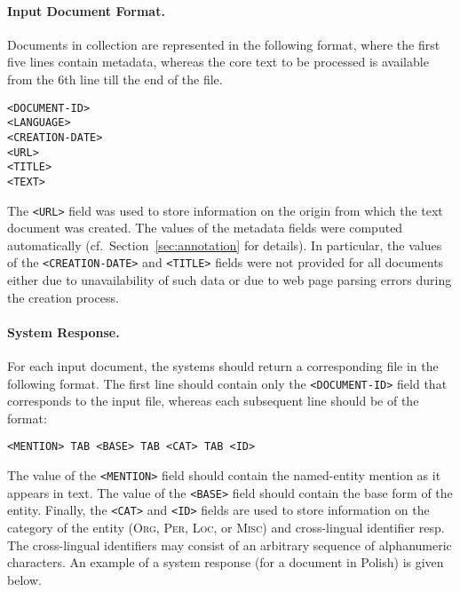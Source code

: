 \documentclass[11pt]{article}
\begin{document}
\paragraph{Input Document Format.}
\label{subsec:input}
%
Documents in collection are represented in the following
format, where the first five lines contain metadata, whereas the core text
to be processed is available from the 6th line till the end of the file.

\begin{small}
\begin{verbatim}
<DOCUMENT-ID>
<LANGUAGE>
<CREATION-DATE>
<URL>
<TITLE>
<TEXT>
\end{verbatim}
\end{small}

\noindent The \verb+<URL>+ field was used to store information on the origin from which 
the text document was created. The values of the metadata fields were computed automatically 
(cf.~Section~\ref{sec:annotation} for details). In particular, the values of the \verb+<CREATION-DATE>+ 
and \verb+<TITLE>+ fields were not provided for all documents either due to unavailability 
of such data or due to web page parsing errors during the creation process. 

\paragraph{System Response.}
\label{subsec:input}
%
For each input document, the systems should return a corresponding file in the following format.
The first line should contain only the \verb+<DOCUMENT-ID>+ field that corresponds to the input file,
whereas each subsequent line should be of the format:

\begin{small}
\begin{verbatim}
<MENTION> TAB <BASE> TAB <CAT> TAB <ID>
\end{verbatim}
\end{small}

\noindent The value of the \verb+<MENTION>+ field should contain the
named-entity mention as it appears in text. The value of the \verb+<BASE>+
field should contain the base form of the entity. Finally, the \verb+<CAT>+ and
\verb+<ID>+ fields are used to store information on the category of the entity
(\textsc{Org}, \textsc{Per}, \textsc{Loc}, or \textsc{Misc}) and cross-lingual
identifier resp.  The cross-lingual identifiers may consist of an arbitrary
sequence of alphanumeric characters.  An example of a system response (for a
document in Polish) is given below.
\end{document}
